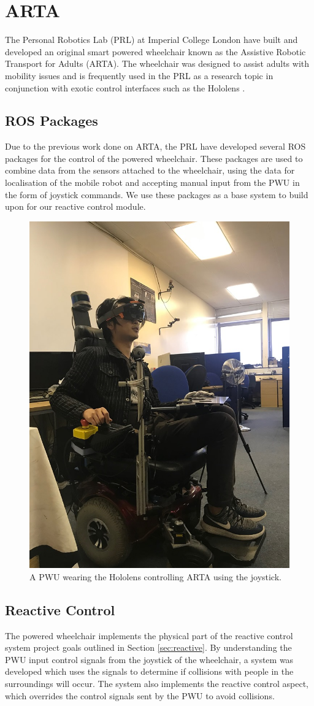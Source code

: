 \section{ARTA}
The Personal Robotics Lab (PRL) at Imperial College London have built and developed an original smart powered wheelchair known as the Assistive Robotic Transport for Adults (ARTA). The wheelchair was designed to assist adults with mobility issues and is frequently used in the PRL as a research topic in conjunction with exotic control interfaces such as the Hololens \cite{Zolotas2018, Chacon-Quesada}.

\subsection{ROS Packages}
Due to the previous work done on ARTA, the PRL have developed several ROS packages for the control of the powered wheelchair. These packages are used to combine data from the sensors attached to the wheelchair, using the data for localisation of the mobile robot and accepting manual input from the PWU in the form of joystick commands. We use these packages as a base system to build upon for our reactive control module.

\begin{figure}[ht]
    \centering
    \includegraphics[width=0.4\linewidth]{img/chapter4_analysis/zihanARTA.jpg}
    \caption{A PWU wearing the Hololens controlling ARTA using the joystick.}
    \label{fig:zihanARTA}
    \vspace{-1\baselineskip}
\end{figure}

\subsection{Reactive Control}
The powered wheelchair implements the physical part of the reactive control system project goals outlined in Section \ref{sec:reactive}. By understanding the PWU input control signals from the joystick of the wheelchair, a system was developed which uses the signals to determine if collisions with people in the surroundings will occur. The system also implements the reactive control aspect, which overrides the control signals sent by the PWU to avoid collisions.

